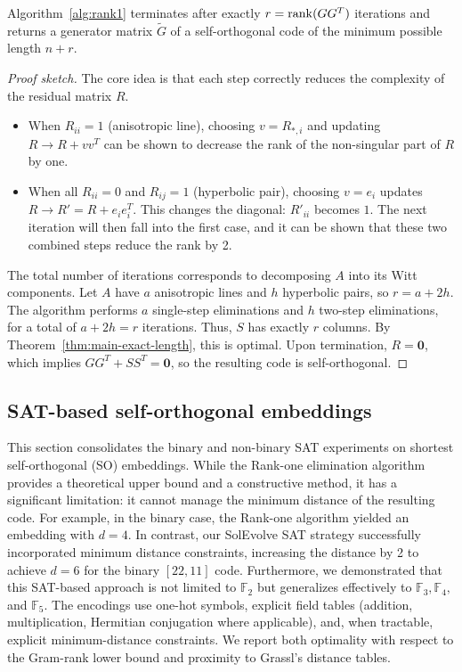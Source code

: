 \begin{theorem}
\label{thm:main-exact-length}
Algorithm~\ref{alg:rank1} terminates after exactly $r = \mathrm{rank}(GG^T)$ iterations and returns a generator matrix $\widetilde{G}$ of a self-orthogonal code of the minimum possible length $n+r$.
\end{theorem}

\begin{proof}[Proof sketch]
The core idea is that each step correctly reduces the complexity of the residual matrix $R$.
\begin{itemize}
    \item When $R_{ii}=1$ (anisotropic line), choosing $v=R_{*,i}$ and updating $R \to R+vv^T$ can be shown to decrease the rank of the non-singular part of $R$ by one.
    \item When all $R_{ii}=0$ and $R_{ij}=1$ (hyperbolic pair), choosing $v=e_i$ updates $R \to R' = R + e_ie_i^T$. This changes the diagonal: $R'_{ii}$ becomes $1$. The next iteration will then fall into the first case, and it can be shown that these two combined steps reduce the rank by 2.
\end{itemize}
The total number of iterations corresponds to decomposing $A$ into its Witt components. Let $A$ have $a$ anisotropic lines and $h$ hyperbolic pairs, so $r = a+2h$. The algorithm performs $a$ single-step eliminations and $h$ two-step eliminations, for a total of $a+2h=r$ iterations. Thus, $S$ has exactly $r$ columns. By Theorem~\ref{thm:main-exact-length}, this is optimal. Upon termination, $R=\mathbf{0}$, which implies $GG^T + SS^T = \mathbf{0}$, so the resulting code is self-orthogonal.
\end{proof}

\subsection{SAT-based self-orthogonal embeddings}

This section consolidates the binary and non-binary SAT experiments on shortest self-orthogonal (SO) embeddings. While the Rank-one elimination algorithm provides a theoretical upper bound and a constructive method, it has a significant limitation: it cannot manage the minimum distance of the resulting code. For example, in the binary case, the Rank-one algorithm yielded an embedding with $d=4$. In contrast, our SolEvolve SAT strategy successfully incorporated minimum distance constraints, increasing the distance by 2 to achieve $d=6$ for the binary $[22,11]$ code. Furthermore, we demonstrated that this SAT-based approach is not limited to $\mathbb{F}_2$ but generalizes effectively to $\mathbb{F}_3, \mathbb{F}_4,$ and $\mathbb{F}_5$. The encodings use one-hot symbols, explicit field tables (addition, multiplication, Hermitian conjugation where applicable), and, when tractable, explicit minimum-distance constraints. We report both optimality with respect to the Gram-rank lower bound and proximity to Grassl’s distance tables.


